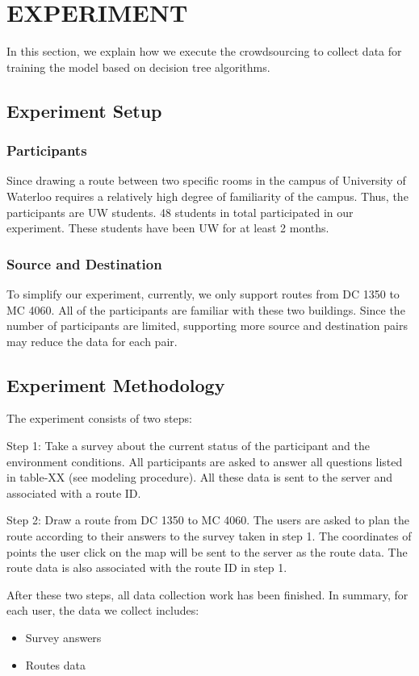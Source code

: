 \documentclass{sigchi}
\begin{document}
\section{EXPERIMENT}

In this section, we explain how we execute the crowdsourcing to collect data for training the model based on decision tree algorithms.

\subsection{Experiment Setup}
\subsubsection{Participants}
Since drawing a route between two specific rooms in the campus of University of Waterloo requires a relatively high degree of familiarity of the campus. Thus, the participants are UW students. 48 students in total participated in our experiment. These students have been UW for at least 2 months.
\subsubsection{ Source and Destination}
To simplify our experiment, currently, we only support routes from DC 1350 to MC 4060. All of the participants are familiar with these two buildings. Since the number of participants are limited, supporting more source and destination pairs may reduce the data for each pair.

\subsection{Experiment Methodology}

The experiment consists of two steps:


Step 1: Take a survey about the current status of the participant and the environment conditions. All participants are asked to answer all questions listed in table-XX (see modeling procedure). All these data is sent to the server and associated with a route ID.


Step 2: Draw a route from DC 1350 to MC 4060. The users are asked to plan the route according to their answers to the survey taken in step 1. The coordinates of points the user click on the map will be sent to the server as the route data. The route data is also associated with the route ID in step 1.


After these two steps, all data collection work has been finished. In summary, for each user, the data we collect includes:
\begin{itemize}
\item Survey answers
\item Routes data
\end{itemize}
\end{document}
